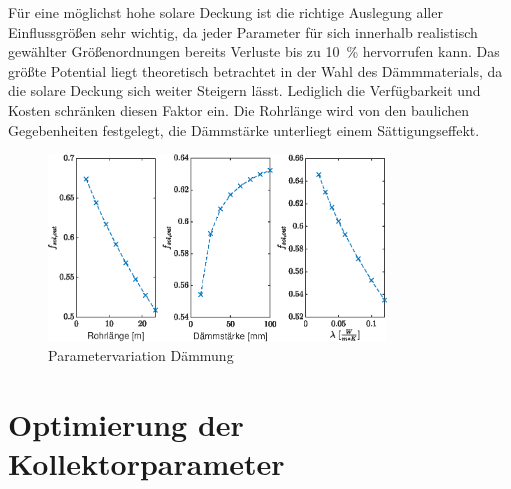 Für eine möglichst hohe solare Deckung ist die richtige Auslegung aller Einflussgrößen sehr wichtig, da jeder Parameter für sich innerhalb realistisch gewählter Größenordnungen bereits Verluste bis zu \SI{10}{\percent} hervorrufen kann. Das größte Potential liegt theoretisch betrachtet in der Wahl des Dämmmaterials, da die solare Deckung sich weiter Steigern lässt. Lediglich die Verfügbarkeit und Kosten schränken diesen Faktor ein. Die Rohrlänge wird von den baulichen Gegebenheiten festgelegt, die Dämmstärke unterliegt einem Sättigungseffekt.

\begin{figure}[H]
	\centering
	\includegraphics[width=0.8\textwidth]{../DATA/Aufgabe2.3.eps}
	\caption[Parametervariation Dämmung]{Parametervariation Dämmung}
	\label{fig:par2}
\end{figure}

\section{Optimierung der Kollektorparameter}

